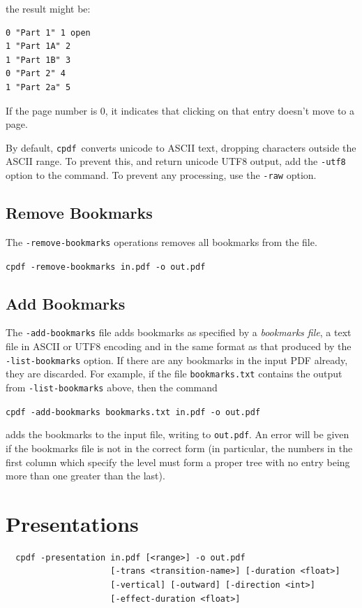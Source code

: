 \documentclass[a4paper,makeidx]{memoir}
\newcommand{\cpdf}{\texttt{cpdf}}
\begin{document}
\noindent the result might be:
\begin{framed}
\begin{verbatim}
0 "Part 1" 1 open
1 "Part 1A" 2
1 "Part 1B" 3
0 "Part 2" 4
1 "Part 2a" 5
\end{verbatim}
\end{framed}
\noindent If the page number is 0, it indicates that clicking on that entry doesn't move to a page.

By default, \cpdf\ converts unicode to ASCII text, dropping characters outside
the ASCII range. To prevent this, and return unicode UTF8 output, add the
\texttt{-utf8} option to the command. To prevent any processing, use the
\texttt{-raw} option.

  \section{Remove Bookmarks}
  \label{removebookmarks}
  The \texttt{-remove-bookmarks} operations removes all bookmarks from the file.
  \begin{framed}
    \small\verb!cpdf -remove-bookmarks in.pdf -o out.pdf!
  \end{framed}

  \section{Add Bookmarks}
  
  The \texttt{-add-bookmarks} file adds bookmarks as specified by a
\textit{bookmarks file}, a text file in ASCII or UTF8 encoding and in the same format as that produced by the
\texttt{-list-bookmarks} option. If there are any bookmarks in the input PDF
already, they are discarded. For example, if the file \texttt{bookmarks.txt}
contains the output from \texttt{-list-bookmarks} above, then the command
  \begin{framed}
   \small\verb!cpdf -add-bookmarks bookmarks.txt in.pdf -o out.pdf!
  \end{framed}
\noindent adds the bookmarks to the input file, writing to \texttt{out.pdf}. An error
will be given if the bookmarks file is not in the correct form (in particular,
the numbers in the first column which specify the level must form a proper
tree with no entry being more than one greater than the last).

\chapter{Presentations}
  \begin{framed}
  \small\noindent\begin{verbatim}
  cpdf -presentation in.pdf [<range>] -o out.pdf
                     [-trans <transition-name>] [-duration <float>]
                     [-vertical] [-outward] [-direction <int>]
                     [-effect-duration <float>]\end{verbatim}
\end{framed}
\end{document}
